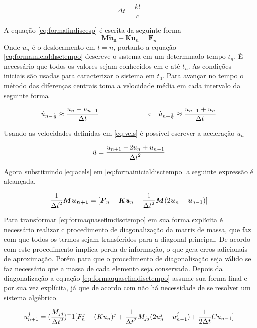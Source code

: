 \begin{equation}
\Delta t = \frac{k l }{c}
\label{eq:defdeltat}
\end{equation}

A equação \ref{eq:formafindiscesp} é escrita da seguinte forma
    \begin{equation} \label{eq:formainicialdisctempo}
    \boldsymbol{M \ddot{u}_n } + \boldsymbol{K}\boldsymbol{u}_n = \boldsymbol{F}_n
\end{equation}
Onde $ u_n $ é o deslocamento em $t=n$, portanto a equação \ref{eq:formainicialdisctempo} descreve o sistema em um determinado tempo $t_n $. È necessário que todos os valores sejam conhecidos em e até $ t_n $. As condições iniciais são usadas para caracterizar o sistema em $ t_0 $. Para avançar no tempo o método das diferenças centrais toma a velocidade média em cada intervalo da seguinte forma

\begin{align} \label{eq:vels}
    \dot{u}_{n-\frac{1}{2}} \approx \ddfrac{u_n - u_{n-1}}{\Delta t} & \hspace{25mm} \text{e} & \dot{u}_{n+\frac{1}{2}} \approx \ddfrac{ u_{n+1} + u_n}{\Delta t} 
\end{align} 

Usando as velocidades definidas em \ref{eq:vels} é possível escrever a aceleração $ \ddot{u}_n $ 

\begin{equation} \label{eq:acels}
    \ddot{u} = \frac{\displaystyle u_{n+1} - 2u_n + u_{n-1}}{\displaystyle \Delta t^2}
\end{equation}

Agora substituindo \ref{eq:acels} em \ref{eq:formainicialdisctempo} a seguinte expressão é alcançada.

\begin{equation} \label{eq:formaquasefimdisctempo}
    \frac{\displaystyle 1}{\displaystyle \Delta t^2}\boldsymbol{M} \boldsymbol{u_{n+1}} = [\boldsymbol{F}_n - \boldsymbol{Ku}_n + \frac{\displaystyle 1}{\displaystyle \Delta t^2}\boldsymbol{M}(2\boldsymbol{u}_n - \boldsymbol{u}_{n-1}) ]
\end{equation}

Para transformar \ref{eq:formaquasefimdisctempo} em sua forma explícita é necessário realizar o procedimento de diagonalização da matriz de massa, que faz com que todos os termos sejam transferidos para a diagonal principal. De acordo com \cite{Paulo} este procedimento implica perda de informação, o que gera erros adicionais de aproximação. Porém para que o procedimento de diagonalização seja válido se faz necessário que a massa de cada elemento seja conservada. Depois da diagonalização a equação \ref{eq:formaquasefimdisctempo} assume sua forma final e por sua vez explícita, já que de acordo com \cite{Paulo} não há necessidade de se resolver um sistema algébrico.

\begin{equation}
    u^j_{n+1} = (\frac{\displaystyle M_{jj}}{\displaystyle \Delta t^2} )^-1 [F_n^j - (Ku_n)^j + \frac{\displaystyle 1}{\displaystyle \Delta t^2}M_{jj}(2u_n^j - u_{n-1}^j) + \frac{\displaystyle 1}{\displaystyle 2 \Delta t}C u_{n-1}]
\end{equation}

